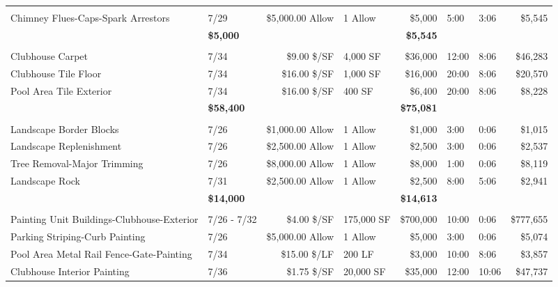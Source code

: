 \documentclass[11pt,letterpaper]{article}
\begin{document}
\begin{longtable}{p{5.1cm} p{1.6cm} r p{1.7cm} r p{1.0cm} p{1.2cm} r}
\addlinespace[6pt]
\multicolumn{8}{l}{\textbf{Fire Safety}} \\
\rowcolor{blue!12} Chimney Flues-Caps-Spark Arrestors & 7/29 & \$5,000.00 Allow & 1 Allow & \$5,000 & 5:00 & 3:06 & \$5,545 \\
\addlinespace[1pt] \multicolumn{4}{r}{} & \textbf{\$5,000} & & & \textbf{\$5,545} \\
\addlinespace[6pt]
\multicolumn{8}{l}{\textbf{Flooring}} \\
\rowcolor{blue!12} Clubhouse Carpet & 7/34 & \$9.00 \$/SF & 4,000 SF & \$36,000 & 12:00 & 8:06 & \$46,283 \\
Clubhouse Tile Floor & 7/34 & \$16.00 \$/SF & 1,000 SF & \$16,000 & 20:00 & 8:06 & \$20,570 \\
\rowcolor{blue!12} Pool Area Tile Exterior & 7/34 & \$16.00 \$/SF & 400 SF & \$6,400 & 20:00 & 8:06 & \$8,228 \\
\addlinespace[1pt] \multicolumn{4}{r}{} & \textbf{\$58,400} & & & \textbf{\$75,081} \\
\addlinespace[6pt]
\multicolumn{8}{l}{\textbf{Landscape}} \\
\rowcolor{blue!12} Landscape Border Blocks & 7/26 & \$1,000.00 Allow & 1 Allow & \$1,000 & 3:00 & 0:06 & \$1,015 \\
Landscape Replenishment & 7/26 & \$2,500.00 Allow & 1 Allow & \$2,500 & 3:00 & 0:06 & \$2,537 \\
\rowcolor{blue!12} Tree Removal-Major Trimming & 7/26 & \$8,000.00 Allow & 1 Allow & \$8,000 & 1:00 & 0:06 & \$8,119 \\
Landscape Rock & 7/31 & \$2,500.00 Allow & 1 Allow & \$2,500 & 8:00 & 5:06 & \$2,941 \\
\addlinespace[1pt] \multicolumn{4}{r}{} & \textbf{\$14,000} & & & \textbf{\$14,613} \\
\addlinespace[6pt]
\multicolumn{8}{l}{\textbf{Painting}} \\
\rowcolor{blue!12} Painting Unit Buildings-Clubhouse-Exterior & 7/26 - 7/32 & \$4.00 \$/SF & 175,000 SF & \$700,000 & 10:00 & 0:06 & \$777,655 \\
Parking Striping-Curb Painting & 7/26 & \$5,000.00 Allow & 1 Allow & \$5,000 & 3:00 & 0:06 & \$5,074 \\
\rowcolor{blue!12} Pool Area Metal Rail Fence-Gate-Painting & 7/34 & \$15.00 \$/LF & 200 LF & \$3,000 & 10:00 & 8:06 & \$3,857 \\
Clubhouse Interior Painting & 7/36 & \$1.75 \$/SF & 20,000 SF & \$35,000 & 12:00 & 10:06 & \$47,737 \\

\end{longtable}
\end{document}
